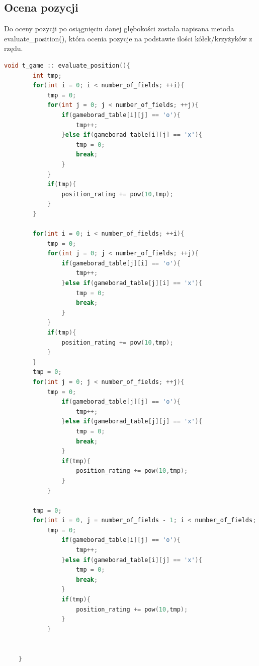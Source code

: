 \documentclass[12pt]{article}
\begin{document}
        \subsection{Ocena pozycji}
            Do oceny pozycji po osiągnięciu danej głębokości została napisana metoda  evaluate\_position(), która ocenia 
            pozycje na podstawie ilości kółek/krzyżyków z rzędu.
            \begin{lstlisting}[language=C++, caption=evaluate\_position()]
    void t_game :: evaluate_position(){
        int tmp;
        for(int i = 0; i < number_of_fields; ++i){
            tmp = 0;
            for(int j = 0; j < number_of_fields; ++j){
                if(gameborad_table[i][j] == 'o'){
                    tmp++;
                }else if(gameborad_table[i][j] == 'x'){
                    tmp = 0;
                    break;
                }
            }
            if(tmp){
                position_rating += pow(10,tmp);
            }
        }
    
        for(int i = 0; i < number_of_fields; ++i){
            tmp = 0;
            for(int j = 0; j < number_of_fields; ++j){
                if(gameborad_table[j][i] == 'o'){
                    tmp++;
                }else if(gameborad_table[j][i] == 'x'){
                    tmp = 0;
                    break;
                }
            }
            if(tmp){
                position_rating += pow(10,tmp);
            }
        }
        tmp = 0;
        for(int j = 0; j < number_of_fields; ++j){
            tmp = 0;
                if(gameborad_table[j][j] == 'o'){
                    tmp++;
                }else if(gameborad_table[j][j] == 'x'){
                    tmp = 0;
                    break;
                }
                if(tmp){
                    position_rating += pow(10,tmp);
                }
            }
            
        tmp = 0;
        for(int i = 0, j = number_of_fields - 1; i < number_of_fields; ++i, --j){
            tmp = 0;
                if(gameborad_table[i][j] == 'o'){
                    tmp++;
                }else if(gameborad_table[i][j] == 'x'){
                    tmp = 0;
                    break;
                }
                if(tmp){
                    position_rating += pow(10,tmp);
                }
            }
            
       
    }
                
            \end{lstlisting}
                
\end{document}
